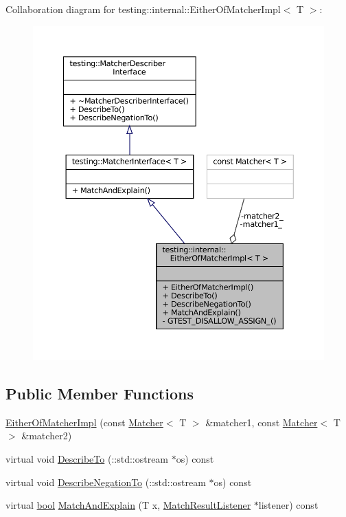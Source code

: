 Collaboration diagram for testing\+:\+:internal\+:\+:Either\+Of\+Matcher\+Impl$<$ T $>$\+:
\nopagebreak
\begin{figure}[H]
\begin{center}
\leavevmode
\includegraphics[width=350pt]{classtesting_1_1internal_1_1EitherOfMatcherImpl__coll__graph}
\end{center}
\end{figure}
\subsection*{Public Member Functions}
\begin{DoxyCompactItemize}
\item 
\hyperlink{classtesting_1_1internal_1_1EitherOfMatcherImpl_af7008f5d8f2950fbe75e6ff9b78af584}{Either\+Of\+Matcher\+Impl} (const \hyperlink{classtesting_1_1Matcher}{Matcher}$<$ T $>$ \&matcher1, const \hyperlink{classtesting_1_1Matcher}{Matcher}$<$ T $>$ \&matcher2)
\item 
virtual void \hyperlink{classtesting_1_1internal_1_1EitherOfMatcherImpl_a0389690d0ce06a1ca447db6281a380d3}{Describe\+To} (\+::std\+::ostream $\ast$os) const
\item 
virtual void \hyperlink{classtesting_1_1internal_1_1EitherOfMatcherImpl_ab5a4eac981acde377a4fd344507b1d71}{Describe\+Negation\+To} (\+::std\+::ostream $\ast$os) const
\item 
virtual \hyperlink{classbool}{bool} \hyperlink{classtesting_1_1internal_1_1EitherOfMatcherImpl_af00ed8cd85c36f1e862bf85f776cee3b}{Match\+And\+Explain} (T x, \hyperlink{classtesting_1_1MatchResultListener}{Match\+Result\+Listener} $\ast$listener) const
\end{DoxyCompactItemize}
